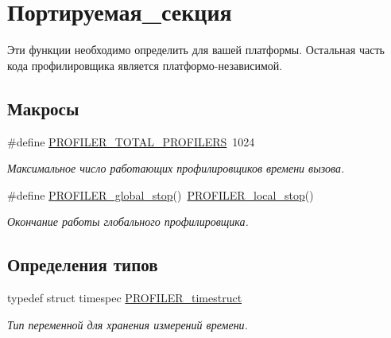 \hypertarget{group___xD0_x9F_xD0_xBE_xD1_x80_xD1_x82_xD0_xB8_xD1_x80_xD1_x83_xD0_xB5_xD0_xBC_xD0_xB0_xD1_x8F_2ef1b31e26d7139e4bfe94879d1322e3}{\section{Портируемая\-\_\-секция}
\label{group___xD0_x9F_xD0_xBE_xD1_x80_xD1_x82_xD0_xB8_xD1_x80_xD1_x83_xD0_xB5_xD0_xBC_xD0_xB0_xD1_x8F_2ef1b31e26d7139e4bfe94879d1322e3}
}


Эти функции необходимо определить для вашей платформы. Остальная часть кода профилировщика является платформо-\/независимой.  


\subsection*{Макросы}
\begin{DoxyCompactItemize}
\item 
\#define \hyperlink{group___xD0_x9F_xD0_xBE_xD1_x80_xD1_x82_xD0_xB8_xD1_x80_xD1_x83_xD0_xB5_xD0_xBC_xD0_xB0_xD1_x8F_2ef1b31e26d7139e4bfe94879d1322e3_ga775939d541e95ea75e6e7066a1cc6bcb}{\-P\-R\-O\-F\-I\-L\-E\-R\-\_\-\-T\-O\-T\-A\-L\-\_\-\-P\-R\-O\-F\-I\-L\-E\-R\-S}~1024
\begin{DoxyCompactList}\small\item\em Максимальное число работающих профилировщиков времени вызова. \end{DoxyCompactList}\item 
\#define \hyperlink{group___xD0_x9F_xD0_xBE_xD1_x80_xD1_x82_xD0_xB8_xD1_x80_xD1_x83_xD0_xB5_xD0_xBC_xD0_xB0_xD1_x8F_2ef1b31e26d7139e4bfe94879d1322e3_ga425fb9e92c3523ab2a3581d2cbefb5ce}{\-P\-R\-O\-F\-I\-L\-E\-R\-\_\-global\-\_\-stop}()~\hyperlink{_p_r_o_f_i_l_i_n_g__tools_8h_ad8354a6502e89adea8535f4029a15b5f}{\-P\-R\-O\-F\-I\-L\-E\-R\-\_\-local\-\_\-stop}()
\begin{DoxyCompactList}\small\item\em Окончание работы глобального профилировщика. \end{DoxyCompactList}\end{DoxyCompactItemize}
\subsection*{Определения типов}
\begin{DoxyCompactItemize}
\item 
typedef struct timespec \hyperlink{group___xD0_x9F_xD0_xBE_xD1_x80_xD1_x82_xD0_xB8_xD1_x80_xD1_x83_xD0_xB5_xD0_xBC_xD0_xB0_xD1_x8F_2ef1b31e26d7139e4bfe94879d1322e3_gae02193769f3b21a09fc0d5035e566a75}{\-P\-R\-O\-F\-I\-L\-E\-R\-\_\-timestruct}
\begin{DoxyCompactList}\small\item\em Тип переменной для хранения измерений времени. \end{DoxyCompactList}\end{DoxyCompactItemize}
